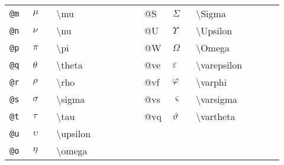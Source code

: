 \documentclass[8pt]{extarticle} %
\begin{document}
\begin{multicols}{3}
\begin{tabular}{L{0.08\linewidth} L{0.08\linewidth} L{0.3\linewidth}L{0.08\linewidth} L{0.08\linewidth} L{0.3\linewidth}}
	\tt @m & $\mu$      & \textbackslash mu        & @S & $\Sigma$ & \textbackslash Sigma  \\
	\tt @n & $\nu$      & \textbackslash nu        & @U & $\Upsilon$ & \textbackslash Upsilon  \\
	\tt @p & $\pi$      & \textbackslash pi        & @W & $\Omega$ & \textbackslash Omega  \\
	\tt @q & $\theta$   & \textbackslash theta     & @ve & $\varepsilon$ & \textbackslash varepsilon  \\
	\tt @r & $\rho$     & \textbackslash rho       & @vf & $\varphi$ & \textbackslash varphi  \\
	\tt @s & $\sigma$   & \textbackslash sigma     & @vs & $\varsigma$ & \textbackslash varsigma  \\
	\tt @t & $\tau$     & \textbackslash tau       & @vq & $\vartheta$ & \textbackslash vartheta  \\
	\tt @u & $\upsilon$ & \textbackslash upsilon   &  & &  \\
	\tt @o & $\eta$     & \textbackslash omega     &  &  & \\
  \end{tabular}

  \vspace*{1ex}

\end{multicols}
\end{document}
